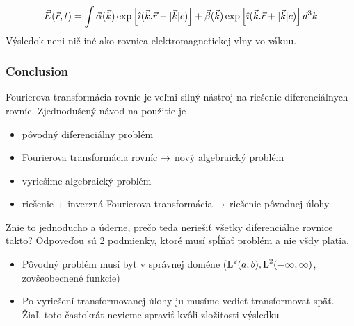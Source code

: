 \begin{equation}
 \vec{E}{(\vec{r},t)} = \int \vec{\alpha}(\vec{k}) \exp \left[\hat{\imath}(
 \vec{k}.\vec{r} - |\vec{k}| c) \right] +
 \vec{\beta}(\vec{k}) \exp \left[\hat{\imath}(
 \vec{k}.\vec{r} + |\vec{k}| c)\right] d^3k
\end{equation}
Výsledok neni nič iné ako rovnica elektromagnetickej vlny vo vákuu.

\subsubsection{Conclusion}
Fourierova transformácia rovníc je veľmi silný nástroj na riešenie
diferenciálnych rovníc. Zjednodušený návod na použitie je 
\begin{itemize}
\item pôvodný diferenciálny problém
\item Fourierova transformácia rovníc $\rightarrow$ nový algebraický
problém
\item vyriešime algebraický problém
\item riešenie + inverzná Fourierova transformácia $\rightarrow$ riešenie
pôvodnej úlohy
\end{itemize}

Znie to jednoducho a úderne, prečo teda neriešiť všetky diferenciálne
rovnice takto? Odpoveďou sú 2 podmienky, ktoré musí spĺňať problém a
nie všdy platia.
\begin{itemize}
\item Pôvodný problém musí byť v správnej doméne ($\mbox{L}^2(a,b),\mbox{L}^2(-\infty,\infty)$,
zovšeobecnené funkcie)
\item Po vyriešení transformovanej úlohy ju musíme vedieť
transformovať späť. Žiaľ, toto častokrát nevieme spraviť kvôli
zložitosti výsledku
\end{itemize}
